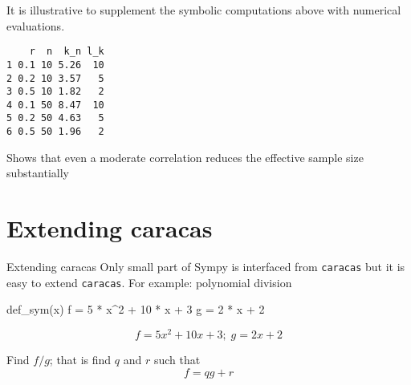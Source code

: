 \documentclass[
  ignorenonframetext,
]{beamer}
\newenvironment{Shaded}{\begin{snugshade}}{\end{snugshade}}
\newcommand{\AttributeTok}[1]{\textcolor[rgb]{0.40,0.45,0.13}{#1}}
\newcommand{\DecValTok}[1]{\textcolor[rgb]{0.68,0.00,0.00}{#1}}
\newcommand{\FunctionTok}[1]{\textcolor[rgb]{0.28,0.35,0.67}{#1}}
\newcommand{\NormalTok}[1]{\textcolor[rgb]{0.00,0.23,0.31}{#1}}
\newcommand{\OtherTok}[1]{\textcolor[rgb]{0.00,0.23,0.31}{#1}}
\newcommand{\SpecialCharTok}[1]{\textcolor[rgb]{0.37,0.37,0.37}{#1}}
\begin{document}
\begin{frame}[fragile]
It is illustrative to supplement the symbolic computations above with
numerical evaluations.

\begin{Shaded}
\end{Shaded}

\begin{verbatim}
    r  n  k_n l_k
1 0.1 10 5.26  10
2 0.2 10 3.57   5
3 0.5 10 1.82   2
4 0.1 50 8.47  10
5 0.2 50 4.63   5
6 0.5 50 1.96   2
\end{verbatim}

Shows that even a moderate correlation reduces the effective sample size
substantially
\end{frame}

\hypertarget{extending-caracas}{%
\section{Extending caracas}\label{extending-caracas}}

\begin{frame}[fragile]{Extending caracas}
Only small part of Sympy is interfaced from \texttt{caracas} but it is
easy to extend \texttt{caracas}. For example: polynomial division

\begin{Shaded}
\begin{Highlighting}[]
\FunctionTok{def\_sym}\NormalTok{(x)}
\NormalTok{f }\OtherTok{=} \DecValTok{5} \SpecialCharTok{*}\NormalTok{ x}\SpecialCharTok{\^{}}\DecValTok{2} \SpecialCharTok{+} \DecValTok{10} \SpecialCharTok{*}\NormalTok{ x }\SpecialCharTok{+} \DecValTok{3}
\NormalTok{g }\OtherTok{=} \DecValTok{2} \SpecialCharTok{*}\NormalTok{ x }\SpecialCharTok{+} \DecValTok{2}
\end{Highlighting}
\end{Shaded}

\[
f = 5 x^{2} + 10 x + 3; \; g=2 x + 2
\]

Find \(f / g\); that is find \(q\) and \(r\) such that \[
  f = q g + r
\]
\end{frame}
\end{document}
